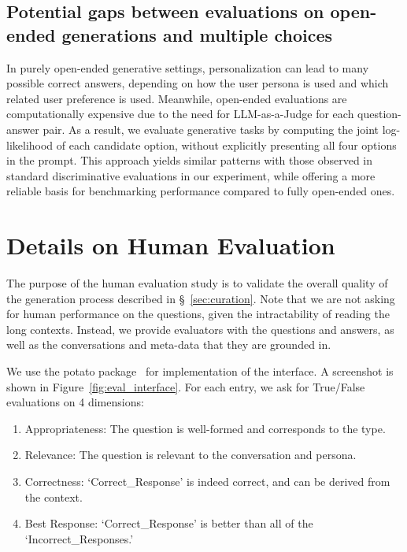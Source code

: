 \subsection{Potential gaps between evaluations on open-ended generations and multiple choices}
In purely open-ended generative settings, personalization can lead to many possible correct answers, depending on how the user persona is used and which related user preference is used. Meanwhile, open-ended evaluations are computationally expensive due to the need for LLM-as-a-Judge for each question-answer pair. As a result, we evaluate generative tasks by computing the joint log-likelihood of each candidate option, without explicitly presenting all four options in the prompt. This approach yields similar patterns with those observed in standard discriminative evaluations in our experiment, while offering a more reliable basis for benchmarking performance compared to fully open-ended ones.


\newpage

\FloatBarrier

\section{Details on Human Evaluation}
\label{sec:human_eval}


The purpose of the human evaluation study is to validate the overall quality of the generation process described in \S~\ref{sec:curation}. Note that we are not asking for human performance on the questions, given the intractability of reading the long contexts. Instead, we provide evaluators with the questions and answers, as well as the conversations and meta-data that they are grounded in.

We use the potato package~\citep{pei2022potato} for implementation of the interface. A screenshot is shown in Figure~\ref{fig:eval_interface}.
For each entry, we ask for True/False evaluations on 4 dimensions:
\begin{enumerate}
    \item Appropriateness: The question is well-formed and corresponds to the type.
    \item Relevance: The question is relevant to the conversation and persona.
    \item Correctness: `Correct\_Response' is indeed correct, and can be derived from the context.
    \item Best Response: `Correct\_Response' is better than all of the `Incorrect\_Responses.'
\end{enumerate}

